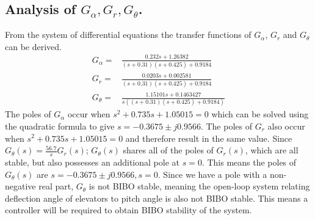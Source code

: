 \documentclass[10pt,a4paper]{article}
\begin{document}
    \subsection{Analysis of $G_{\alpha}, G_{r}, G_{\theta}$.}
    From the system of differential equations the transfer functions of $G_{\alpha}$, $G_{r}$ and $G_{\theta}$ can be derived.
    \begin{subequations}
        \begin{align}
            G_\alpha =& \frac{0.232s + 1.26382}{(s + 0.31)(s + 0.425) + 0.9184} \\
            G_r =& \frac{0.0203s + 0.002581}{(s + 0.31)(s + 0.425) + 0.9184} \\
            G_\theta =& \frac{1.15101s + 0.1463427}{s((s + 0.31)(s + 0.425) + 0.9184)}
        \end{align}
    \end{subequations}
    The poles of $G_\alpha$ occur when $s^{2}+0.735s+1.05015=0$ which can be solved using the quadratic formula to give $s=-0.3675 \pm j0.9566$. The poles of $G_r$ also occur when $s^{2}+0.735s+1.05015=0$ and therefore result in the same value. Since $G_{\theta}(s)=\frac{56.7}{s}G_{r}(s)$; $G_{\theta}(s)$ shares all of the poles of $G_{r}(s)$, which are all stable, but also possesses an additional pole at $s=0$. This means the poles of $G_{\theta}(s)$ are $s=-0.3675 \pm j0.9566, s=0$. Since we have a pole with a non-negative real part, $G_{\theta}$ is not BIBO stable, meaning the open-loop system relating deflection angle of elevators to pitch angle is also not BIBO stable. This means a controller will be required to obtain BIBO stability of the system.
\end{document}
